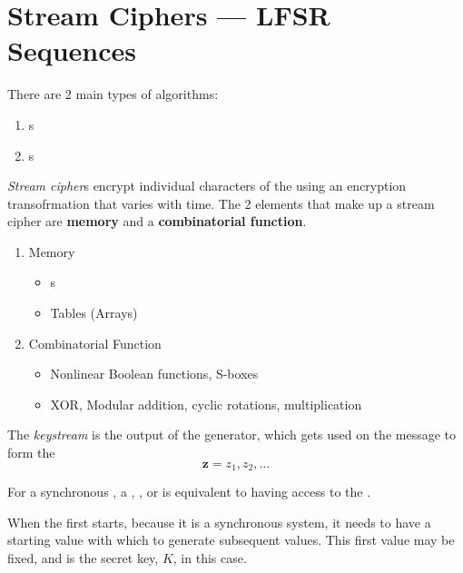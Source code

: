 \section{Stream Ciphers --- LFSR Sequences}\label{sec:Stream_Ciphers}
There are 2 main types of  algorithms:
\begin{enumerate}[noitemsep]
\item {}s
\item {}s
\end{enumerate}

\begin{definition}\label{def:Stream_Cipher}
  \emph{Stream cipher}s encrypt individual characters of the  using an encryption transofrmation that varies with time.
  The 2 elements that make up a stream cipher are \textbf{memory} and a \textbf{combinatorial function}.
  \begin{enumerate}[noitemsep]
  \item Memory
    \begin{itemize}[noitemsep]
    \item {}s
    \item Tables (Arrays)
    \end{itemize}
  \item Combinatorial Function
    \begin{itemize}[noitemsep]
    \item Nonlinear Boolean functions, S-boxes
    \item XOR, Modular addition, cyclic rotations, multiplication
    \end{itemize}
  \end{enumerate}
\end{definition}

\begin{definition}[Keystream]\label{def:Keystream}
  The \emph{keystream} is the output of the generator, which gets used on the  message to form the 
  \begin{equation}\label{eq:Keystream}
    \mathbf{z} = z_{1}, z_{2}, \ldots
  \end{equation}

  \begin{remark}[Attacks]\label{rmk:Keystream_Attack_Vectors}
    For a synchronous , a , , or  is equivalent to having access to the .
  \end{remark}

  \begin{remark}\label{rmk:Keystream_Secret_Key}
    When the  first starts, because it is a synchronous system, it needs to have a starting value with which to generate subsequent values.
    This first value may be fixed, and is the secret key, $K$, in this case.
  \end{remark}
\end{definition}

